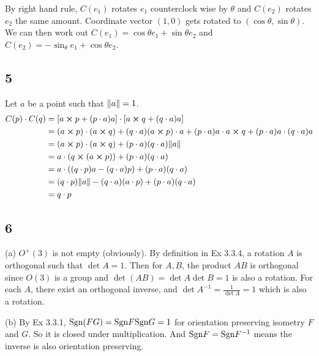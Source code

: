 \documentclass[12pt]{article}
\begin{document}
By right hand rule, $C(e_1)$ rotates $e_1$ counterclock wise by $\theta$ and $C(e_2)$ rotates $e_2$ the same amount. Coordinate vector $(1, 0)$ gets rotated to $(\cos\theta, \sin\theta)$. We can then work out $C(e_1) = \cos\theta e_1 + \sin \theta e_2$ and $C(e_2) = -\sin_\theta e_1 + \cos \theta e_2$.

\subsection*{5}
Let $a$ be a point such that $\norm{a} = 1$. 
$$
\begin{aligned}
	C(p) \cdot C(q) &= [a \cross p + (p \cdot a) a] \cdot [a \cross q + ( q \cdot a) a] \\
	&= (a \cross p) \cdot (a \cross q)  + ( q \cdot a) (a \cross p)\cdot a +  (p \cdot a) a \cdot a \cross q + (p \cdot a) a \cdot  ( q \cdot a) a \\
	&=  (a \cross p) \cdot (a \cross q) + (p \cdot a) ( q \cdot a) \norm{a} \\
	&=   a \cdot (q \cross (a \cross p)) + (p \cdot a) ( q \cdot a)	\\
	&=   a \cdot ((q \cdot p)a - (q \cdot a) p ) + (p \cdot a) ( q \cdot a)	\\
	&=  (q \cdot p) \norm{a} - (q \cdot a) (a\cdot p ) + (p \cdot a) ( q \cdot a)	\\
	&=  q \cdot p	\\
\end{aligned} $$
\QED

\subsection*{6}
(a) $O^+(3)$ is not empty (obviously). By definition in Ex 3.3.4, a rotation $A$ is orthogonal such that $\det A = 1$. Then for $A, B$,  the product $AB$ is orthogonal since $O(3)$ is a group and $\det(AB) = \det A \det B = 1 $ is also a rotation.  For each $A$, there exist an orthogonal inverse, and $\det A^{-1} = \frac{1}{\det A} = 1$ which is also a rotation.

(b) By Ex 3.3.1,  $\mbox{Sgn}(FG) = \mbox{Sgn} F \mbox{Sgn} G = 1$ for orientation preserving isometry $F$ and $G$. So it is closed under multiplication. And $\mbox{Sgn} F = \mbox{Sgn} F^{-1}$ means the inverse is also orientation preserving.
\end{document}
